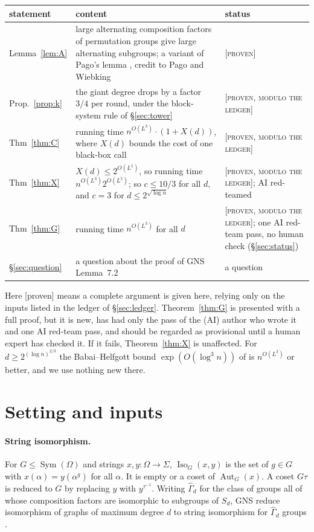 \documentclass[11pt]{article}
\theoremstyle{definition}
\theoremstyle{remark}
\newcommand{\Sym}{\operatorname{Sym}}
\newcommand{\Aut}{\operatorname{Aut}}
\newcommand{\Iso}{\operatorname{Iso}}
\newcommand{\Gammahat}{\widehat\Gamma}
\newcommand{\Proven}{\textsc{[proven]}}
\newcommand{\ProvenM}{\textsc{[proven, modulo the ledger]}}
\begin{document}
\medskip
\noindent\begin{tabularx}{\linewidth}{@{}p{2.7cm}Xp{3.4cm}@{}}
\toprule
statement & content & status\\
\midrule
Lemma~\ref{lem:A} & large alternating composition factors of permutation groups give large alternating subgroups; a variant of Pago's lemma \cite{Pago23}, credit to Pago and Wiebking & \Proven\\
Prop.~\ref{prop:k} & the giant degree drops by a factor $3/4$ per round, under the block-system rule of \S\ref{sec:tower} & \ProvenM\\
Thm~\ref{thm:C} & running time $n^{O(L^3)}\cdot(1+X(d))$, where $X(d)$ bounds the cost of one black-box call & \ProvenM\\
Thm~\ref{thm:X} & $X(d)\le 2^{O(L^5)}$, so running time $n^{O(L^3)}2^{O(L^5)}$; so $c\le 10/3$ for all $d$, and $c=3$ for $d\le 2^{\sqrt{\log n}}$ & \ProvenM; AI red-teamed\\
Thm~\ref{thm:G} & running time $n^{O(L^3)}$ for all $d$ & \ProvenM; one AI red-team pass, no human check (\S\ref{sec:status})\\
\S\ref{sec:question} & a question about the proof of GNS Lemma~7.2 & a question\\
\bottomrule
\end{tabularx}
\medskip

Here [proven] means a complete argument is given here, relying only on the inputs listed in the ledger of \S\ref{sec:ledger}. Theorem~\ref{thm:G} is presented with a full proof, but it is new, has had only the pass of the (AI) author who wrote it and one AI red-team pass, and should be regarded as provisional until a human expert has checked it. If it fails, Theorem~\ref{thm:X} is unaffected. For $d\ge 2^{(\log n)^{2/3}}$ the Babai--Helfgott bound $\exp(O(\log^3 n))$ of \cite{HBD} is $n^{O(L^{3})}$ or better, and we use nothing new there.

\section{Setting and inputs}\label{sec:setting}

\paragraph{String isomorphism.} For $G\le\Sym(\Omega)$ and strings $x,y\colon\Omega\to\Sigma$, $\Iso_G(x,y)$ is the set of $g\in G$ with $x(\alpha)=y(\alpha^g)$ for all $\alpha$. It is empty or a coset of $\Aut_G(x)$. A coset $G\tau$ is reduced to $G$ by replacing $y$ with $y^{\tau^{-1}}$. Writing $\Gammahat_d$ for the class of groups all of whose composition factors are isomorphic to subgroups of $S_d$, GNS reduce isomorphism of graphs of maximum degree $d$ to string isomorphism for $\Gammahat_d$ groups \cite[Thm~8.1]{GNS}.
\end{document}
